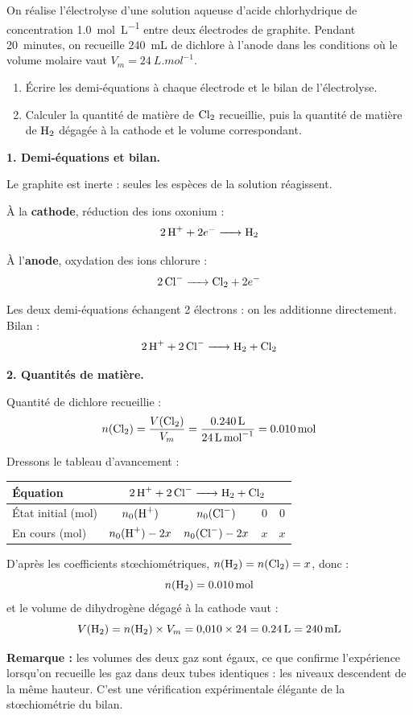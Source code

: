 \documentclass[11pt]{article}
\begin{document}
\begin{exoresolu}
On réalise l'électrolyse d'une solution aqueuse d'acide chlorhydrique de concentration \SI{1,0}{mol.L^{-1}} entre deux électrodes de graphite. Pendant \SI{20}{minutes}, on recueille \SI{240}{mL} de dichlore à l'anode dans les conditions où le volume molaire vaut $V_m = \SI{24}{L.mol^{-1}}$.
\begin{enumerate}
\item Écrire les demi-équations à chaque électrode et le bilan de l'électrolyse.
\item Calculer la quantité de matière de $\ce{Cl2}$ recueillie, puis la quantité de matière de $\ce{H2}$ dégagée à la cathode et le volume correspondant.
\end{enumerate}
\tcblower
\textbf{1. Demi-équations et bilan.}

Le graphite est inerte : seules les espèces de la solution réagissent.

À la \textbf{cathode}, réduction des ions oxonium :
\[ \ce{2H+} + 2e^- \ce{->} \ce{H2} \]

À l'\textbf{anode}, oxydation des ions chlorure :
\[ \ce{2Cl-} \ce{->} \ce{Cl2} + 2e^- \]

Les deux demi-équations échangent 2 électrons : on les additionne directement. Bilan :
\[ \ce{2H+} + \ce{2Cl-} \ce{->} \ce{H2} + \ce{Cl2} \]

\textbf{2. Quantités de matière.}

Quantité de dichlore recueillie :
\[ n(\ce{Cl2}) = \frac{V(\ce{Cl2})}{V_m} = \frac{\SI{0,240}{L}}{\SI{24}{L.mol^{-1}}} = \SI{0,010}{mol} \]

Dressons le tableau d'avancement :
\begin{center}
\begin{tabular}{lcccc}
\toprule
Équation & \multicolumn{4}{c}{$\ce{2H+} + \ce{2Cl-} \ce{->} \ce{H2} + \ce{Cl2}$} \\
\midrule
État initial (mol) & $n_0(\ce{H+})$ & $n_0(\ce{Cl-})$ & $0$ & $0$ \\
En cours (mol) & $n_0(\ce{H+}) - 2x$ & $n_0(\ce{Cl-}) - 2x$ & $x$ & $x$ \\
\bottomrule
\end{tabular}
\end{center}

D'après les coefficients stœchiométriques, $n(\ce{H2}) = n(\ce{Cl2}) = x$, donc :
\[ n(\ce{H2}) = \SI{0,010}{mol} \]
et le volume de dihydrogène dégagé à la cathode vaut :
\[ V(\ce{H2}) = n(\ce{H2}) \times V_m = 0{,}010 \times 24 = \SI{0,24}{L} = \SI{240}{mL} \]

\textbf{Remarque :} les volumes des deux gaz sont égaux, ce que confirme l'expérience lorsqu'on recueille les gaz dans deux tubes identiques : les niveaux descendent de la même hauteur. C'est une vérification expérimentale élégante de la stœchiométrie du bilan.
\end{exoresolu}
\end{document}
